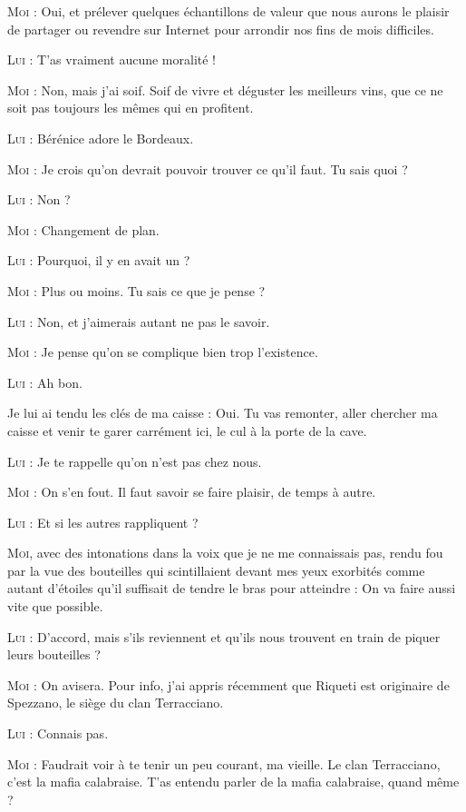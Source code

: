 \textsc{Moi} : Oui, et prélever quelques échantillons de valeur que nous aurons le plaisir de partager ou revendre sur Internet pour arrondir nos fins de mois difficiles.

\textsc{Lui} : T’as vraiment aucune moralité !

\textsc{Moi} : Non, mais j’ai soif. Soif de vivre et déguster les meilleurs vins, que ce ne soit pas toujours les mêmes qui en profitent.

\textsc{Lui} : Bérénice adore le Bordeaux.

\textsc{Moi} : Je crois qu’on devrait pouvoir trouver ce qu’il faut. Tu sais quoi ?

\textsc{Lui} : Non ?

\textsc{Moi} : Changement de plan.

\textsc{Lui} : Pourquoi, il y en avait un ?

\textsc{Moi} : Plus ou moins. Tu sais ce que je pense ?

\textsc{Lui} : Non, et j’aimerais autant ne pas le savoir.

\textsc{Moi} : Je pense qu’on se complique bien trop l’existence.

\textsc{Lui} : Ah bon.

Je lui ai tendu les clés de ma caisse : Oui. Tu vas remonter, aller chercher ma caisse et venir te garer carrément ici, le cul à la porte de la cave.

\textsc{Lui} : Je te rappelle qu’on n’est pas chez nous.

\textsc{Moi} : On s’en fout. Il faut savoir se faire plaisir, de temps à autre.

\textsc{Lui} : Et si les autres rappliquent ?

\textsc{Moi}, avec des intonations dans la voix que je ne me connaissais pas, rendu fou par la vue des bouteilles qui scintillaient devant mes yeux exorbités comme autant d’étoiles qu’il suffisait de tendre le bras pour atteindre : On va faire aussi vite que possible.

\textsc{Lui} : D’accord, mais s’ils reviennent et qu’ils nous trouvent en train de piquer leurs bouteilles ?

\textsc{Moi} : On avisera. Pour info, j’ai appris récemment que Riqueti est originaire de Spezzano, le siège du clan Terracciano.

\textsc{Lui} : Connais pas.

\textsc{Moi} : Faudrait voir à te tenir un peu courant, ma vieille. Le clan Terracciano, c’est la mafia calabraise. T’as entendu parler de la mafia calabraise, quand même ?

